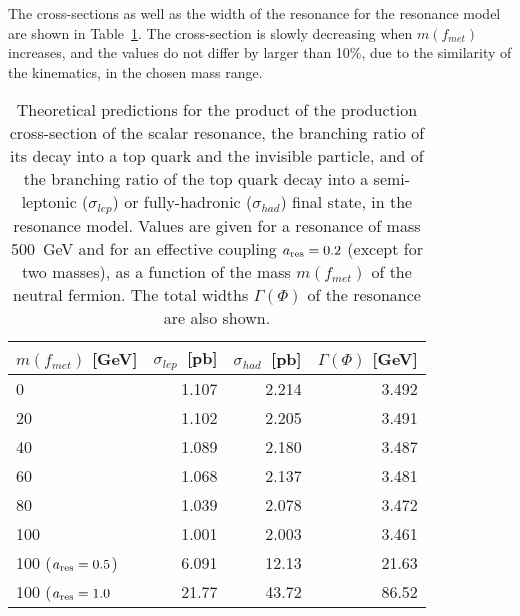 The cross-sections as well as the width of the resonance for the resonance model are shown in Table~\ref{tab:S1R_Xsec}.  
The cross-section is slowly decreasing when $m(f_{met})$ increases,
and the values do not differ by larger than 10\%, due to the similarity of the kinematics, in the chosen mass range.
\begin{table}[!htb]\centering
\begin{tabular}{l|r|r|r}
\hline \hline
$m(f_{met})$ [GeV] & $\sigma_{lep}$~[pb] & $\sigma_{had}$~[pb] & $\Gamma(\Phi)$ [GeV]   \\
\hline \hline
0                        &  1.107              & 2.214               &  3.492  \\
20                       &  1.102              & 2.205               &  3.491  \\
40                       &  1.089              & 2.180               &  3.487  \\
60                       &  1.068              & 2.137               &  3.481 \\	
80                       &  1.039              & 2.078               &  3.472  \\
100                      &  1.001              & 2.003               &  3.461  \\
100 ($a_{\mathrm{res}}=0.5$) &  6.091              &  12.13              & 21.63    \\
100 ($a_{\mathrm{res}}=1.0$  &  21.77              &  43.72              &  86.52   \\
\hline \hline
\end{tabular}
\caption
{
Theoretical predictions for the product of the production cross-section of the
scalar resonance, the branching ratio of its decay into a top quark and the invisible particle,
and of the branching ratio of the top quark decay into a semi-leptonic ($\sigma_{lep}$) or fully-hadronic ($\sigma_{had}$) final state,
in the resonance model.
Values are given for a resonance of mass 500~GeV and for an effective coupling $a_{\mathrm{res}}=0.2$ (except for two masses),
as a function of the mass $m(f_{met})$ of the neutral fermion.
The total widths $\Gamma(\Phi)$ of the resonance are also shown.
}
\label{tab:S1R_Xsec}
\end{table}



